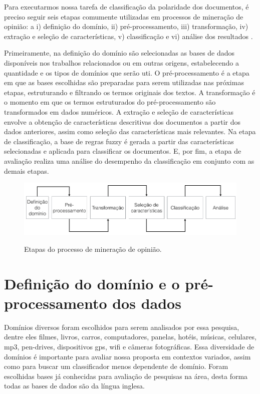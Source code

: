 Para executarmos nossa tarefa de classificação da polaridade dos documentos, é preciso seguir seis etapas comumente utilizadas em processos de mineração de opinião: a i) definição do domínio, ii) pré-processamento, iii) transformação, iv) extração e seleção de características, v) classificação e vi) análise dos resultados \cite{moraes2012document}. 



Primeiramente, na definição do domínio são selecionadas as bases de dados disponíveis nos trabalhos relacionados ou em outras origens, estabelecendo a quantidade e os tipos de domínios que serão uti. O pré-processamento é a etapa em que as bases escolhidas são preparadas para serem utilizadas nas próximas etapas, estruturando e filtrando os termos originais dos textos. A transformação é o momento em que os termos estruturados do pré-processamento são transformados em dados numéricos. A extração e seleção de características envolve a obtenção de características descritivas dos documentos a partir dos dados anteriores, assim como seleção das características mais relevantes. Na etapa de classificação, a base de regras fuzzy é gerada a partir das características selecionadas e aplicada para classificar os documentos. E, por fim, a etapa de avaliação realiza uma análise do desempenho da classificação em conjunto com as demais etapas. 

\begin{figure}[h]
\caption{Etapas do processo de mineração de opinião.}
\centering
\includegraphics[scale=0.55]{opinion_mining_process_2.png}
\label{figura:processo_mineracao}
\end{figure}


\section{Definição do domínio e o pré-processamento dos dados}

Domínios diversos foram escolhidos para serem analisados por essa pesquisa, dentre eles filmes, livros, carros, computadores, panelas, hotéis, músicas, celulares, mp3, pen-drives, dispositivos gps, wifi e câmeras fotográficas. Essa diversidade de domínios é importante para avaliar nossa proposta em contextos variados, assim como para buscar um classificador menos dependente de domínio. Foram escolhidas bases já conhecidas para avaliação de pesquisas na área, desta forma todas as bases de dados são da língua inglesa.

